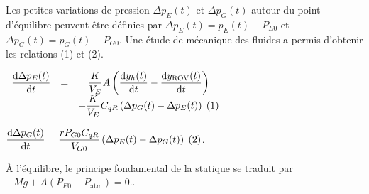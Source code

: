 \begin{multicols}{2}
Les petites variations de pression $\Delta p_E(t)$ et $\Delta p_G(t)$ autour du point d’équilibre peuvent être
définies par $\Delta p_E(t) = p_E(t) - P_{E0}$ et $\Delta p_G(t) = p_G(t) -P_{G0}$.
Une étude de mécanique des fluides a permis d’obtenir les relations (1) et (2).

$
\begin{array}{ccc}
\dfrac{\text d\Delta p_E(t)}{\text dt} &=& \dfrac{K}{V_E} A\left( \dfrac{\text d y_h(t)}{\text dt}-\dfrac{\text d y_{\text{ROV}}(t)}{\text dt}\right) \\ 
&& +\dfrac{K}{V_E} C_{qR}\left(\Delta p_G(t)-\Delta p_E(t)\right) \; (1)
\end{array}$

$\dfrac{\text d\Delta p_G(t)}{\text dt}=\dfrac{rP_{G0}C_{qR}}{V_{G0}}\left(\Delta p_E(t)-\Delta p_G(t)\right)  \; (2)$.


\fi

% 
% 
% 
% 

À l'équilibre, le principe fondamental de la statique se traduit par $-Mg + A(P_{E0}-P_{\text{atm}})=0.$.

%
%  
%


\end{multicols}
